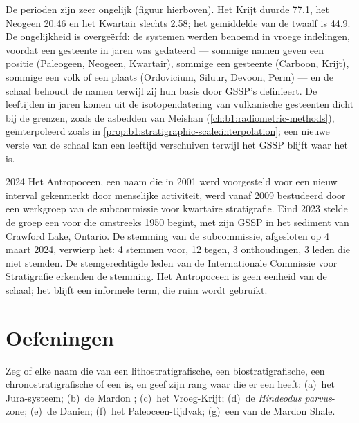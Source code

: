De perioden zijn zeer ongelijk (figuur hierboven). Het Krijt duurde \qty{77.1}{\Myr}, het Neogeen \qty{20.46}{\Myr} en het Kwartair slechts \qty{2.58}{\Myr}; het gemiddelde van de twaalf is \qty{44.9}{\Myr}. De ongelijkheid is overgeërfd: de systemen werden benoemd in vroege indelingen, voordat een gesteente in jaren was gedateerd --- sommige namen geven een positie (Paleogeen, Neogeen, Kwartair), sommige een gesteente (Carboon, Krijt), sommige een volk of een plaats (Ordovicium, Siluur, Devoon, Perm) --- en de schaal behoudt de namen terwijl zij hun basis door GSSP's definieert. De leeftijden in jaren komen uit de isotopendatering van vulkanische gesteenten dicht bij de grenzen, zoals de asbedden van Meishan (\cref{ch:b1:radiometric-methods}), geïnterpoleerd zoals in \cref{prop:b1:stratigraphic-scale:interpolation}; een nieuwe versie van de schaal kan een leeftijd verschuiven terwijl het GSSP blijft waar het is.

\begin{dated}{2024}
Het Antropoceen, een naam die in 2001 werd voorgesteld voor een nieuw interval gekenmerkt door menselijke activiteit, werd vanaf 2009 bestudeerd door een werkgroep van de subcommissie voor kwartaire stratigrafie. Eind 2023 stelde de groep een  voor die omstreeks 1950 begint, met zijn GSSP in het sediment van Crawford Lake, Ontario. De stemming van de subcommissie, afgesloten op 4 maart 2024, verwierp het: 4 stemmen voor, 12 tegen, 3 onthoudingen, 3 leden die niet stemden. De stemgerechtigde leden van de Internationale Commissie voor Stratigrafie erkenden de stemming. Het Antropoceen is geen eenheid van de schaal; het blijft een informele term, die ruim wordt gebruikt.
\end{dated}

\section{Oefeningen}

\begin{exercise}[$\star$]\label{exo:b1:stratigraphic-scale:1}
Zeg of elke naam die van een lithostratigrafische, een biostratigrafische, een chronostratigrafische of een  is, en geef zijn rang waar die er een heeft: (a)~het Jura-systeem; (b)~de Mardon ; (c)~het Vroeg-Krijt; (d)~de \emph{Hindeodus parvus}-zone; (e)~de  Danien; (f)~het Paleoceen-tijdvak; (g)~een  van de Mardon Shale.
\end{exercise}

